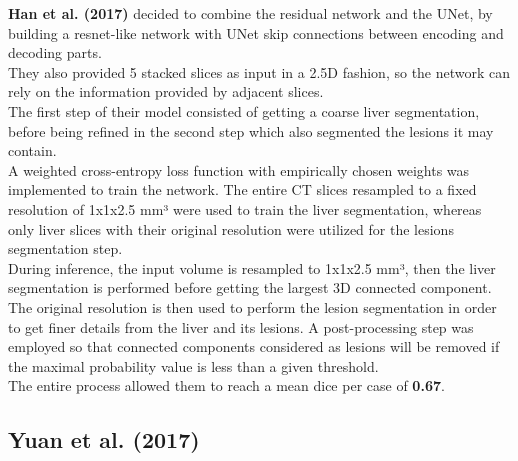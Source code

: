 \textbf{Han et al. (2017)} decided to combine the residual network and
the UNet, by building a resnet-like network with UNet skip connections
between encoding and decoding parts.\\
They also provided 5 stacked slices as input in a 2.5D fashion, so the
network can rely on the information provided by adjacent slices.\\
The first step of their model consisted of getting a coarse liver
segmentation, before being refined in the second step which also
segmented the lesions it may contain.\\
A weighted cross-entropy loss function with empirically chosen weights
was implemented to train the network. The entire CT slices resampled to
a fixed resolution of 1x1x2.5 mm³ were used to train the liver
segmentation, whereas only liver slices with their original resolution
were utilized for the lesions segmentation step.\\
During inference, the input volume is resampled to 1x1x2.5 mm³, then the
liver segmentation is performed before getting the largest 3D connected
component. The original resolution is then used to perform the lesion
segmentation in order to get finer details from the liver and its
lesions. A post-processing step was employed so that connected
components considered as lesions will be removed if the maximal
probability value is less than a given threshold.\\
The entire process allowed them to reach a mean dice per case of
\textbf{0.67}.

\subsection*{Yuan et al. (2017)}\label{yuan-et-al.-2017}

